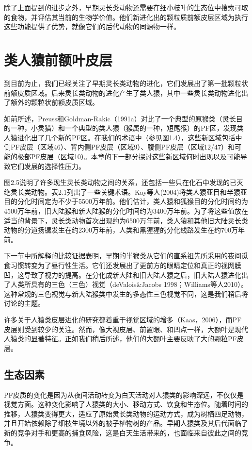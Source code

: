 除了上面提到的进步之外，早期灵长类动物还需要在细小枝叶的生态位中搜索可取的食物，并评估其当前的生物学价值。他们新进化出的颗粒质前额皮层区域为执行这些功能提供了优势，就像它们的后代动物的同源物一样。

\section{类人猿前额叶皮层}
到目前为止，我们已经关注了早期灵长类动物的进化，它们发展出了第一批颗粒状前额皮质区域。后来灵长类动物的进化产生了类人猿，其中一些灵长类动物进化出了额外的颗粒状前额皮质区域。

如前所述，Preuss和Goldman-Rakic（1991a）对比了一个典型的原猴类（灵长目的一种，小灵猫）和一个典型的类人猿（猴属的一种，短尾猴）的PF区，发现类人猿进化出了几个新的PF区。在我们的术语中（参见图1.4），这些新区域包括中侧PF皮层（区域46）、背内侧PF皮层（区域9）、腹侧PF皮层（区域12/47）和可能的极部PF皮层（区域10）。本章的下一部分探讨这些新区域何时出现以及可能导致它们发展的选择性压力。

图2.5说明了许多现生灵长类动物之间的关系，还包括一些只在化石中发现的已灭绝灵长类动物。表2.1列出了一些关键术语。Kay等人(2004)将类人猿亚目和半猿亚目的分化时间定为不少于5500万年前。他们估计，类人猿和狐猴目的分化时间约为4500万年前，旧大陆猴和新大陆猴的分化时间约为3400万年前。为了将这些值放在适当的背景下，灵长类动物首次出现约为6500万年前，类人猿和其他旧大陆灵长类动物的分道扬镳发生在约2300万年前，人类和黑猩猩的分化线路发生在约700万年前。

下一节中所解释的比较证据表明，早期的半猴类从它们的直系祖先所采用的夜间觅食习惯转变为了昼行性生活。它们还发展出了更前方的眼睛定位和真正的视网膜凹，这导致了视力的提高。在分化成新大陆和旧大陆人猿之后，旧大陆人猿进化出了人类所具有的三色（三色）视觉（deValois\&Jacobs 1998；Williams等人2010）。这种常规的三色视觉与新大陆猴类中发生的多态性三色视觉不同，这是我们稍后将讨论的主题。

许多关于人猿类皮层进化的研究都着重于视觉区域的增多（Kaas，2006），而PF皮层则受到较少的关注。然而，像大视皮层、前置眼、和凹点一样，大额叶是现代人猿类的显著特征。正如我们稍后所述，他们的大额叶主要反映了大的颗粒PF皮层。

\subsection{生态因素}
PF皮质的变化是因为从夜间活动转变为白天活动对人猿类的影响深远，不仅仅是视觉方面。这种变化影响了人猿类的大小、移动方式、饮食和生态位。随着时间的推移，人猿类变得更大，适应了原始灵长类动物的运动方式，成为树栖四足动物，并且开始依赖除了细枝生境以外的被子植物树的产品。早期人猿类及其后代面临了新的竞争对手和更高的捕食风险，这是白天生活带来的，也面临来自彼此之间的竞争。

